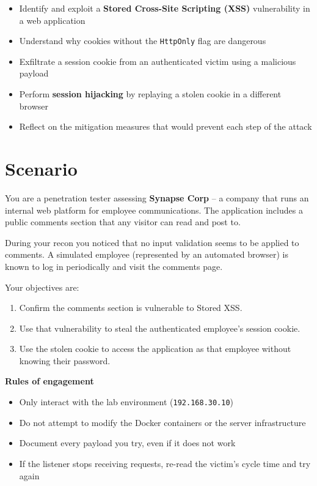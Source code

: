 \documentclass[a4paper, 12pt]{article}
\begin{document}
\begin{itemize}[leftmargin=1.5em]
    \item Identify and exploit a \textbf{Stored Cross-Site Scripting (XSS)} vulnerability in a web application
    \item Understand why cookies without the \texttt{HttpOnly} flag are dangerous
    \item Exfiltrate a session cookie from an authenticated victim using a malicious payload
    \item Perform \textbf{session hijacking} by replaying a stolen cookie in a different browser
    \item Reflect on the mitigation measures that would prevent each step of the attack
\end{itemize}

\section{Scenario}

You are a penetration tester assessing \textbf{Synapse Corp} -- a company that runs an
internal web platform for employee communications. The application includes a public
comments section that any visitor can read and post to.

During your recon you noticed that no input validation seems to be applied to comments.
A simulated employee (represented by an automated browser) is known to log in
periodically and visit the comments page.

Your objectives are:

\begin{enumerate}[leftmargin=2em]
    \item Confirm the comments section is vulnerable to Stored XSS.
    \item Use that vulnerability to steal the authenticated employee's session cookie.
    \item Use the stolen cookie to access the application as that employee without
          knowing their password.
\end{enumerate}

\begin{mdframed}[backgroundcolor=labgray, linecolor=labred, linewidth=1pt]
\textbf{Rules of engagement}
\begin{itemize}[leftmargin=1.5em, topsep=2pt]
    \item Only interact with the lab environment (\texttt{192.168.30.10})
    \item Do not attempt to modify the Docker containers or the server infrastructure
    \item Document every payload you try, even if it does not work
    \item If the listener stops receiving requests, re-read the victim's cycle time
          and try again
\end{itemize}
\end{mdframed}
\end{document}

